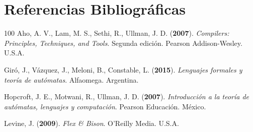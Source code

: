 \documentclass{article}
\begin{document}
    \newpage

\section{Referencias Bibliográficas}
    \begin{thebibliography}{100}
Aho, A. V., Lam, M. S., Sethi, R., Ullman, J. D. ({\bf 2007}). \emph{Compilers: Principles, Techniques, and Tools}. Segunda edición. Pearson Addison-Wesley. U.S.A.

Giró, J., Vázquez, J., Meloni, B., Constable, L. ({\bf 2015}). \emph{Lenguajes formales y teoría de autómatas}. Alfaomega. Argentina.

Hopcroft, J. E., Motwani, R., Ullman, J. D. ({\bf 2007}). \emph{Introducción a la teoría de autómatas, lenguajes y computación}. Pearson Educación. México.

Levine, J. ({\bf 2009}). \emph{Flex \& Bison}. O'Reilly Media. U.S.A.
    \end{thebibliography}
\end{document}
